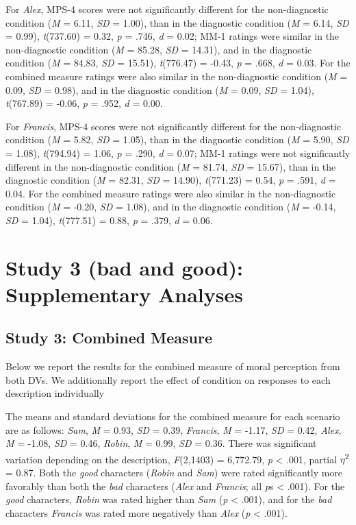 \documentclass[
  man,floatsintext]{apa6}
\begin{document}
For \emph{Alex}, MPS-4 scores were not significantly different for the non-diagnostic condition (\emph{M} = 6.11, \emph{SD} = 1.00), than in the diagnostic condition (\emph{M} = 6.14, \emph{SD} = 0.99), \emph{t}(737.60) = 0.32, \emph{p} = .746, \emph{d} = 0.02; MM-1 ratings were similar in the non-diagnostic condition (\emph{M} = 85.28, \emph{SD} = 14.31), and in the diagnostic condition (\emph{M} = 84.83, \emph{SD} = 15.51), \emph{t}(776.47) = -0.43, \emph{p} = .668, \emph{d} = 0.03. For the combined measure ratings were also similar in the non-diagnostic condition (\emph{M} = 0.09, \emph{SD} = 0.98), and in the diagnostic condition (\emph{M} = 0.09, \emph{SD} = 1.04), \emph{t}(767.89) = -0.06, \emph{p} = .952, \emph{d} = 0.00.

For \emph{Francis}, MPS-4 scores were not significantly different for the non-diagnostic condition (\emph{M} = 5.82, \emph{SD} = 1.05), than in the diagnostic condition (\emph{M} = 5.90, \emph{SD} = 1.08), \emph{t}(794.94) = 1.06, \emph{p} = .290, \emph{d} = 0.07; MM-1 ratings were not significantly different in the non-diagnostic condition (\emph{M} = 81.74, \emph{SD} = 15.67), than in the diagnostic condition (\emph{M} = 82.31, \emph{SD} = 14.90), \emph{t}(771.23) = 0.54, \emph{p} = .591, \emph{d} = 0.04. For the combined measure ratings were also similar in the non-diagnostic condition (\emph{M} = -0.20, \emph{SD} = 1.08), and in the diagnostic condition (\emph{M} = -0.14, \emph{SD} = 1.04), \emph{t}(777.51) = 0.88, \emph{p} = .379, \emph{d} = 0.06.

\pagebreak

\section{Study 3 (bad and good): Supplementary Analyses}\label{study-3-bad-and-good-supplementary-analyses}

\subsection{Study 3: Combined Measure}\label{study-3-combined-measure}

Below we report the results for the combined measure of moral perception from both DVs. We additionally report the effect of condition on responses to each description individually

The means and standard deviations for the combined measure for each scenario are as follows:
\emph{Sam},
\emph{M} = 0.93, \emph{SD} = 0.39,
\emph{Francis},
\emph{M} = -1.17, \emph{SD} = 0.42,
\emph{Alex},
\emph{M} = -1.08, \emph{SD} = 0.46,
\emph{Robin},
\emph{M} = 0.99, \emph{SD} = 0.36. There was significant variation depending on the description, \emph{F}(2,1403) = 6,772.79, \emph{p} \textless{} .001, partial \(\eta\)\textsuperscript{2} = 0.87. Both the \emph{good} characters (\emph{Robin} and \emph{Sam}) were rated significantly more favorably than both the \emph{bad} characters (\emph{Alex} and \emph{Francis}; all \emph{p}s \textless{} .001). For the \emph{good} characters, \emph{Robin} was rated higher than \emph{Sam} (\emph{p} \textless{} .001), and for the \emph{bad} characters \emph{Francis} was rated more negatively than \emph{Alex} (\emph{p} \textless{} .001).
\end{document}
